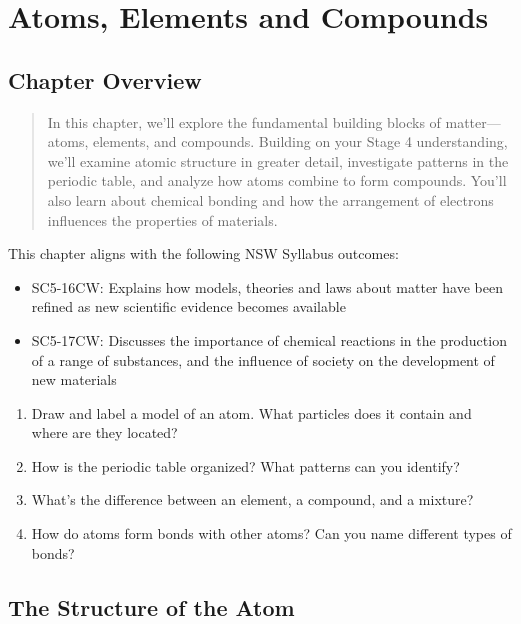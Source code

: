 \chapter{Atoms, Elements and Compounds}

\section*{Chapter Overview}

\begin{quote}
    In this chapter, we'll explore the fundamental building blocks of matter—atoms, elements, and compounds. Building on your Stage 4 understanding, we'll examine atomic structure in greater detail, investigate patterns in the periodic table, and analyze how atoms combine to form compounds. You'll also learn about chemical bonding and how the arrangement of electrons influences the properties of materials.
\end{quote}

\noindent This chapter aligns with the following NSW Syllabus outcomes:
\begin{itemize}
    \item SC5-16CW: Explains how models, theories and laws about matter have been refined as new scientific evidence becomes available
    \item SC5-17CW: Discusses the importance of chemical reactions in the production of a range of substances, and the influence of society on the development of new materials
\end{itemize}

\begin{stopandthink}
\begin{enumerate}
    \item Draw and label a model of an atom. What particles does it contain and where are they located?
    \item How is the periodic table organized? What patterns can you identify?
    \item What's the difference between an element, a compound, and a mixture?
    \item How do atoms form bonds with other atoms? Can you name different types of bonds?
\end{enumerate}
\end{stopandthink}

\section{The Structure of the Atom}

